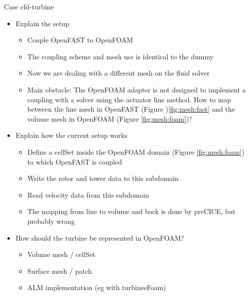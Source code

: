 Case cfd-turbine
\begin{itemize}
	\item Explain the setup
	\begin{itemize}
		\item Couple OpenFAST to OpenFOAM
		\item The coupling scheme and mesh use is identical to the dummy
		\item Now we are dealing with a different mesh on the fluid solver
		\item Main obstacle: The OpenFOAM adapter is not designed to implement a coupling with a solver using the actuator line method. How to map between the line mesh in OpenFAST (Figure )\ref{fig:mesh:fast} and the volume mesh in OpenFOAM (Figure \ref{fig:mesh:foam})?
	\end{itemize}
	\item Explain how the current setup works
	\begin{itemize}
		\item Define a cellSet inside the OpenFOAM domain (Figure \ref{fig:mesh:foam}) to which OpenFAST is coupled
		\item Write the rotor and tower data to this subdomain
		\item Read velocity data from this subdomain
		\item The mapping from line to volume and back is done by preCICE, but probably wrong
	\end{itemize}
	\item How should the turbine be represented in OpenFOAM?
	\begin{itemize}
		\item Volume mesh / cellSet
		\item Surface mesh / patch
		\item ALM implementation (eg with turbinesFoam)\\
	\end{itemize}
\end{itemize}

